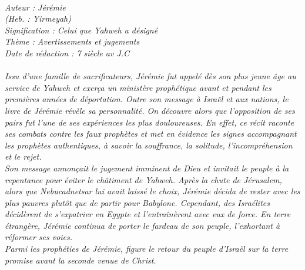\BFont
\noindent\hrulefill
{\footnotesize
\textit{
\bigskip
{\centering{}
\\Auteur : Jérémie
\\(Heb. : Yirmeyah)
\\Signification : Celui que Yahweh a désigné
\\Thème : Avertissements et jugements
\\Date de rédaction : 7 siècle av J.C\\}
}
\textit{
\\Issu d'une famille de sacrificateurs, Jérémie fut appelé dès son plus jeune âge au service de Yahweh et exerça un ministère prophétique avant et pendant les premières années de déportation. Outre son message à Israël et aux nations, le livre de Jérémie révèle sa personnalité. On découvre alors que l'opposition de ses pairs fut l'une de ses expériences les plus douloureuses. En effet, ce récit raconte ses combats contre les faux prophètes et met en évidence les signes accompagnant les prophètes authentiques, à savoir la souffrance, la solitude, l'incompréhension et le rejet.
\\Son message annonçait le jugement imminent de Dieu et invitait le peuple à la repentance pour éviter le châtiment de Yahweh. Après la chute de Jérusalem, alors que Nebucadnetsar lui avait laissé le choix, Jérémie décida de rester avec les plus pauvres plutôt que de partir pour Babylone. Cependant, des Israélites décidèrent de s'expatrier en Egypte et l'entraînèrent avec eux de force. En terre étrangère, Jérémie continua de porter le fardeau de son peuple, l'exhortant à réformer ses voies. 
\\Parmi les prophéties de Jérémie, figure le retour du peuple d'Israël sur la terre promise avant la seconde venue de Christ.\bigskip
}
}
\par\nobreak\noindent\hrulefill
